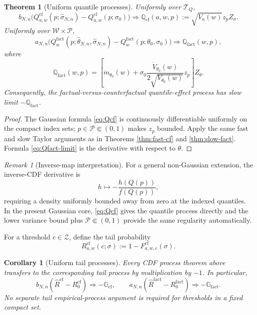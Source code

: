 \documentclass[11pt]{article}
\newtheorem{theorem}[assumption]{Theorem}
\newtheorem{corollary}[assumption]{Corollary}
\theoremstyle{remark}
\newtheorem{remark}[assumption]{Remark}
\newcommand{\cf}{\mathrm{cf}}
\newcommand{\fact}{\mathrm{fact}}
\newcommand{\cW}{\mathcal W}
\newcommand{\cT}{\mathcal T}
\newcommand{\cZ}{\mathcal Z}
\newcommand{\cP}{\mathcal P}
\newcommand{\an}{a_{N,n}}
\newcommand{\bn}{b_{N,n}}
\newcommand{\thetahat}{\widehat\theta_{N,n}}
\newcommand{\sigmahat}{\widehat\sigma_{N,n}}
\begin{document}
\begin{theorem}[Uniform quantile processes]\label{thm:quantile}
Uniformly over $\cT_Q$,
\begin{equation}\label{eq:Qcf-clt}
 \bn\big(
 Q^{\cf}_{a,w}(p;\sigmahat)
 -Q^{\cf}_{a,w}(p;\sigma_0)
 \big)
 \Rightarrow
 \mathbb Q_{\cf}(a,w,p)
 :=\sqrt{V_a(w)}z_pZ_\sigma.
\end{equation}
Uniformly over $\cW\times\cP$,
\begin{equation}\label{eq:Qfact-clt}
 \an\big(
 Q^{\fact}_w(p;\thetahat,\sigmahat)
 -Q^{\fact}_w(p;\theta_0,\sigma_0)
 \big)
 \Rightarrow
 \mathbb Q_{\fact}(w,p),
\end{equation}
where
\begin{equation}\label{eq:Qfact-limit}
 \mathbb Q_{\fact}(w,p)
 =\left[
 \dot m_{\theta_0}(w)
 +\sigma_0\frac{\dot V_{\theta_0}(w)}{2\sqrt{V_{\theta_0}(w)}}z_p
 \right]Z_\theta.
\end{equation}
Consequently, the factual-versus-counterfactual quantile-effect process has slow limit $-\mathbb Q_{\fact}$.
\end{theorem}

\begin{proof}
The Gaussian formula \eqref{eq:Qcf} is continuously differentiable uniformly on the compact index sets; $p\in\cP\Subset(0,1)$ makes $z_p$ bounded.  Apply the same fast and slow Taylor arguments as in Theorems \ref{thm:fast-cf} and \ref{thm:slow-fact}.  Formula \eqref{eq:Qfact-limit} is the derivative with respect to $\theta$.
\end{proof}

\begin{remark}[Inverse-map interpretation]
For a general non-Gaussian extension, the inverse-CDF derivative is
\[
 h\longmapsto-\frac{h(Q(p))}{f(Q(p))},
\]
requiring a density uniformly bounded away from zero at the indexed quantiles.  In the present Gaussian core, \eqref{eq:Qcf} gives the quantile process directly and the lower variance bound plus $\cP\Subset(0,1)$ provide the same regularity automatically.
\end{remark}

For a threshold $c\in\cZ$, define the tail probability
\[
 R^{\cf}_{a,w}(c;\sigma)
 :=1-F^{\cf}_{a,w,c}(\sigma).
\]

\begin{corollary}[Uniform tail processes]\label{cor:tail}
Every CDF process theorem above transfers to the corresponding tail process by multiplication by $-1$.  In particular,
\[
 \bn(\widehat R^{\cf}-R^{\cf}_0)
 \Rightarrow-\mathbb G_{\cf},
 \qquad
 \an(\widehat R^{\fact}-R^{\fact}_0)
 \Rightarrow-\mathbb G_{\fact}.
\]
No separate tail empirical-process argument is required for thresholds in a fixed compact set.
\end{corollary}
\end{document}
